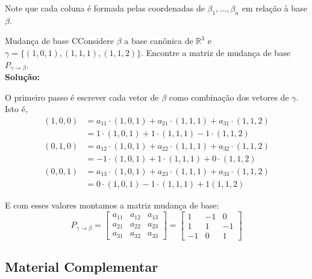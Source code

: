 \documentclass[12pt,a4paper]{article}
\begin{document}
Note que cada coluna é formada pelas coordenadas de $\beta_1, \ldots, \beta_n$ em relação à base $\beta$. 

\begin{exemplo}{Mudança de base}
CConsidere $\beta$ a base canônica de $\mathbb{R}^3$ e $\gamma = \{(1,0,1),(1,1,1),(1,1,2)\}$. Encontre a matriz de mudança de base $P_{\gamma \to \beta}$. \\

\textbf{Solução:}

O primeiro passo é escrever cada vetor de $\beta$ como combinação dos vetores de $\gamma$. Isto é,
\begin{equation*}
\begin{aligned}
(1,0,0) &= a_{11} \cdot (1,0,1) + a_{21} \cdot (1,1,1) + a_{31} \cdot (1,1,2) \\
&= 1 \cdot (1,0,1) + 1 \cdot (1,1,1) - 1 \cdot (1,1,2)
\end{aligned}
\end{equation*}
\begin{equation*}
\begin{aligned}
(0,1,0) &= a_{12} \cdot (1,0,1) + a_{22} \cdot (1,1,1) + a_{32} \cdot (1,1,2) \\
&= -1 \cdot (1,0,1) + 1 \cdot (1,1,1) + 0 \cdot (1,1,2)
\end{aligned}
\end{equation*}
\begin{equation*}
\begin{aligned}
(0,0,1) &= a_{13} \cdot  (1,0,1) + a_{23} \cdot  (1,1,1) + a_{33}  \cdot (1,1,2) \\
&= 0 \cdot (1,0,1) - 1 \cdot (1,1,1) + 1 (1,1,2)
\end{aligned}
\end{equation*}

E com esses valores montamos a matriz mudança de base:
\[
P_{\gamma \to \beta} =
\begin{bmatrix}
a_{11} & a_{12} & a_{13} \\
a_{21} & a_{22} & a_{23} \\
a_{31} & a_{32} & a_{33}
\end{bmatrix}
=
\begin{bmatrix}
1 & -1 & 0 \\
1 & 1 & -1 \\
-1 & 0 & 1
\end{bmatrix}
\]
\end{exemplo}

\subsection{Material Complementar}
\end{document}
